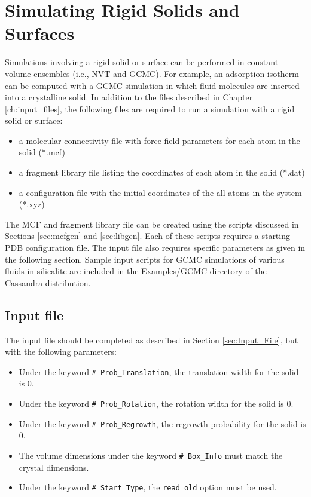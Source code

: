 \chapter{Simulating Rigid Solids and Surfaces}

Simulations involving a rigid solid or surface can be performed in constant volume ensembles
(i.e., NVT and GCMC). 
For example, an adsorption isotherm can be computed with a GCMC simulation in which fluid molecules
are inserted into a crystalline solid.
In addition to the files described in Chapter \ref{ch:input_files}, 
the following files are required to run a simulation with a rigid solid or surface:

\begin{itemize}
\item a molecular connectivity file with force field parameters for each atom in the solid (*.mcf)
\item a fragment library file listing the coordinates of each atom in the solid (*.dat)
\item a configuration file with the initial coordinates of the all atoms in the system (*.xyz) 
\end{itemize} 

The MCF and fragment library file can be created using the scripts discussed in Sections \ref{sec:mcfgen} and \ref{sec:libgen}. 
Each of these scripts requires a starting PDB configuration file.
The input file also requires specific parameters as given in the following section. Sample input scripts for GCMC simulations
of various fluids in silicalite are included in the Examples/GCMC directory of the Cassandra distribution.
 
\section{Input file}
The input file should be completed as described in Section \ref{sec:Input_File}, but with the following parameters:

\begin{itemize}
	\item Under the keyword \texttt{\# Prob\_Translation}, the translation width for the solid is 0.
	\item Under the keyword \texttt{\# Prob\_Rotation}, the rotation width for the solid is 0.
	\item Under the keyword \texttt{\# Prob\_Regrowth}, the regrowth probability for the solid is 0.
	\item The volume dimensions under the keyword \texttt{\# Box\_Info} must match the crystal dimensions.
	\item Under the keyword \texttt{\# Start\_Type}, the \texttt{read\_old} option must be used.
\end{itemize}

